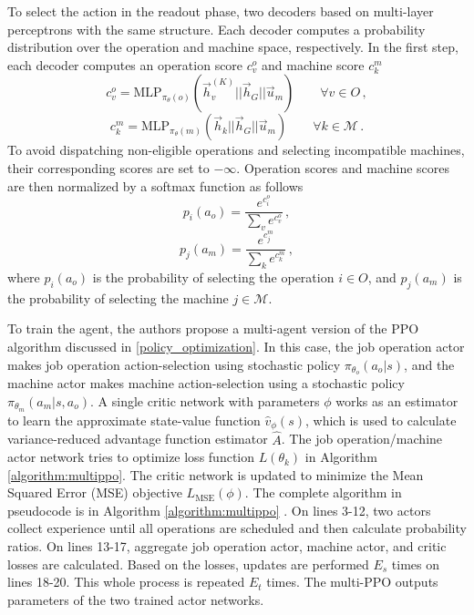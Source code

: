 \par
To select the action in the readout phase, two decoders based on multi-layer perceptrons with the same structure. Each decoder computes a probability distribution over the operation and machine space, respectively. In the first step, each decoder computes an operation score $c^o_{v}$ and machine score $c^m_{k}$ \cite{LEI2022117796}
\begin{equation}
    c^{o}_v = \text{MLP}_{\pi_{\theta}(o)} \left ( \vec{h}_v^{(K)} || \vec{h}_G || \vec{u}_m \right ) \hspace{2em} \forall v \in O \, ,
\end{equation}
\begin{equation}
    c^{m}_k = \text{MLP}_{\pi_{\theta}(m)} \left ( \vec{h}_k || \vec{h}_G || \vec{u}_m \right ) \hspace{2em} \forall k \in \mathcal{M} \, .
\end{equation}
To avoid dispatching non-eligible operations and selecting incompatible machines, their corresponding scores are set to $-\infty$. Operation scores and machine scores are then normalized by a softmax function as follows \cite{LEI2022117796}
\begin{equation}
    p_i (a_o) = \frac{e^{c^o_i}}{\sum_v e^{c^o_v}} \, ,
\end{equation}
\begin{equation}
    p_j (a_m) = \frac{e^{c^m_j}}{\sum_k e^{c^m_k}} \, ,
\end{equation}
where $p_i (a_o)$ is the probability of selecting the operation $i \in O$, and $p_j (a_m)$ is the probability of selecting the machine $j \in \mathcal{M}$.\\
\par
To train the agent, the authors propose a multi-agent version of the PPO algorithm discussed in \ref{policy_optimization}. In this case, the job operation actor makes job operation action-selection using stochastic policy $\pi_{\theta_o}(a_o|s)$, and the machine actor makes machine action-selection using a stochastic policy $\pi_{\theta_m}(a_m | s, a_o)$. A single critic network with parameters $\phi$ works as an estimator to learn the approximate state-value function $\hat{v}_\phi(s)$, which is used to calculate variance-reduced advantage function estimator $\hat{A}$. The job operation/machine actor network tries to optimize loss function $L(\theta_k)$ in Algorithm \ref{algorithm:multippo}. The critic network is updated to minimize the Mean Squared Error (MSE) objective $L_\text{MSE}(\phi)$. The complete algorithm in pseudocode is in Algorithm \ref{algorithm:multippo} \cite{LEI2022117796}. On lines 3-12, two actors collect experience until all operations are scheduled and then calculate probability ratios. On lines 13-17, aggregate job operation actor, machine actor, and critic losses are calculated. Based on the losses, updates are performed $E_s$ times on lines 18-20. This whole process is repeated $E_t$ times. The multi-PPO outputs parameters of the two trained actor networks.

